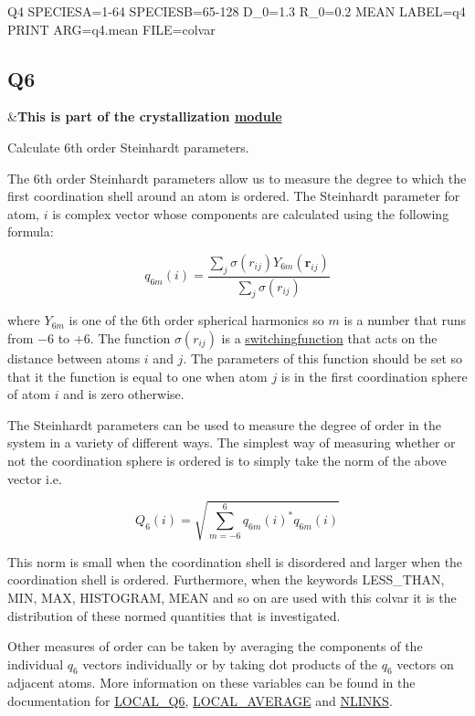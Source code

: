 \begin{DoxyVerb}Q4 SPECIESA=1-64 SPECIESB=65-128 D_0=1.3 R_0=0.2 MEAN LABEL=q4
PRINT ARG=q4.mean FILE=colvar
\end{DoxyVerb}
 \hypertarget{Q6}{}\subsection{Q6}\label{Q6}
\begin{TabularC}{2}
\hline
&{\bfseries  This is part of the crystallization \hyperlink{mymodules}{module }}   \\
\end{TabularC}
Calculate 6th order Steinhardt parameters.

The 6th order Steinhardt parameters allow us to measure the degree to which the first coordination shell around an atom is ordered. The Steinhardt parameter for atom, $i$ is complex vector whose components are calculated using the following formula\+:

\[ q_{6m}(i) = \frac{\sum_j \sigma( r_{ij} ) Y_{6m}(\mathbf{r}_{ij}) }{\sum_j \sigma( r_{ij} ) } \]

where $Y_{6m}$ is one of the 6th order spherical harmonics so $m$ is a number that runs from $-6$ to $+6$. The function $\sigma( r_{ij} )$ is a \hyperlink{switchingfunction}{switchingfunction} that acts on the distance between atoms $i$ and $j$. The parameters of this function should be set so that it the function is equal to one when atom $j$ is in the first coordination sphere of atom $i$ and is zero otherwise.

The Steinhardt parameters can be used to measure the degree of order in the system in a variety of different ways. The simplest way of measuring whether or not the coordination sphere is ordered is to simply take the norm of the above vector i.\+e.

\[ Q_6(i) = \sqrt{ \sum_{m=-6}^6 q_{6m}(i)^{*} q_{6m}(i) } \]

This norm is small when the coordination shell is disordered and larger when the coordination shell is ordered. Furthermore, when the keywords L\+E\+S\+S\+\_\+\+T\+H\+A\+N, M\+I\+N, M\+A\+X, H\+I\+S\+T\+O\+G\+R\+A\+M, M\+E\+A\+N and so on are used with this colvar it is the distribution of these normed quantities that is investigated.

Other measures of order can be taken by averaging the components of the individual $q_6$ vectors individually or by taking dot products of the $q_{6}$ vectors on adjacent atoms. More information on these variables can be found in the documentation for \hyperlink{LOCAL_Q6}{L\+O\+C\+A\+L\+\_\+\+Q6}, \hyperlink{LOCAL_AVERAGE}{L\+O\+C\+A\+L\+\_\+\+A\+V\+E\+R\+A\+G\+E} and \hyperlink{NLINKS}{N\+L\+I\+N\+K\+S}.

